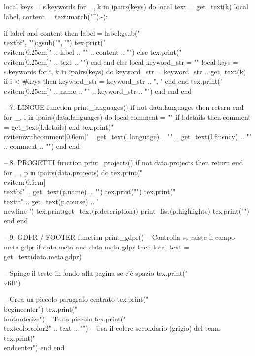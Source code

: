 \begin{luacode*}
    local keys = s.keywords
    for _, k in ipairs(keys) do
    local text = get_text(k)
    local label, content = text:match("^(.-):%

    if label and content then
    label = label:gsub("\\textbf{", ""):gsub("}", "")
    tex.print("\\cvitem[0.25em]{" .. label .. "}{" .. content .. "}")
    else
    tex.print("\\cvitem[0.25em]{}{" .. text .. "}")
    end
    end
    else
    local keyword_str = ""
    local keys = s.keywords
    for i, k in ipairs(keys) do
    keyword_str = keyword_str .. get_text(k)
    if i < #keys then keyword_str = keyword_str .. ", " end
    end
    tex.print("\\cvitem[0.25em]{" .. name .. "}{" .. keyword_str .. "}")
    end
    end
    end

    -- 7. LINGUE
    function print_languages()
    if not data.languages then return end
    for _, l in ipairs(data.languages) do
    local comment = ""
    if l.details then
    comment = get_text(l.details)
    end
    tex.print("\\cvitemwithcomment[0.6em]{" .. get_text(l.language) .. "}{" .. get_text(l.fluency) .. "}{" .. comment .. "}")
    end
    end

    -- 8. PROGETTI
    function print_projects()
    if not data.projects then return end
    for _, p in ipairs(data.projects) do
    tex.print("\\cvitem[0.6em]{\\textbf{" .. get_text(p.name) .. "}}")
    tex.print("{")
    tex.print("\\textit{" .. get_text(p.course) .. "} \\newline ")
    tex.print(get_text(p.description))
    print_list(p.highlights)
    tex.print("}")
    end
    end

    -- 9. GDPR / FOOTER
    function print_gdpr()
    -- Controlla se esiste il campo meta.gdpr
    if data.meta and data.meta.gdpr then
    local text = get_text(data.meta.gdpr)

    -- Spinge il testo in fondo alla pagina se c'è spazio
    tex.print("\\vfill")

    -- Crea un piccolo paragrafo centrato
    tex.print("\\begin{center}")
        tex.print("\\footnotesize") -- Testo piccolo
        tex.print("\\textcolor{color2}{" .. text .. "}") -- Usa il colore secondario (grigio) del tema
        tex.print("\\end{center}")
    end
    end


\end{luacode*}
